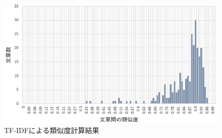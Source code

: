 \documentclass{ltjarticle}
\begin{document}
\newpage
\begin{figure}[ht]
    \centering
    \includegraphics[width = 13cm]{images/ボールペンimages/TF-IDF類似度.png}
    \caption{TF-IDFによる類似度計算結果}
    \label{fig:ボールペン類似度TF-IDF}
\end{figure}
\vspace{30truept}
\end{document}
